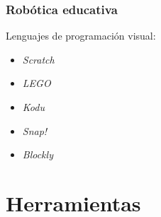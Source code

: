 \documentclass[xcolor={table}]{beamer}
\begin{document}
			\begin{frame}
			\frametitle{Robótica educativa}
			Lenguajes de programación visual:
			\begin{itemize}
				\item \textit{Scratch}
			    \item \textit{LEGO}
			    \item \textit{Kodu}
			    \item \textit{Snap!}
			    \item \textit{Blockly}

			\end{itemize}
		\end{frame}

	\section{Herramientas}
\end{document}
